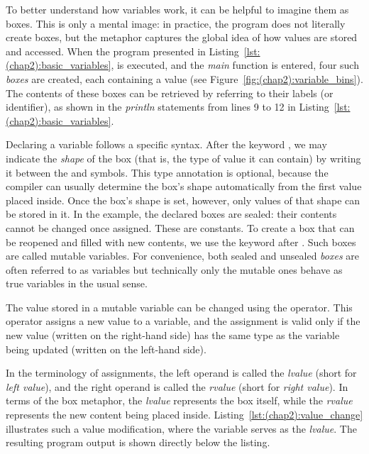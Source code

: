 To better understand how variables work, it can be helpful to imagine them as
boxes. This is only a mental image: in practice, the program does not literally
create boxes, but the metaphor captures the global idea of how values are stored
and accessed. When the program presented in
Listing~\ref{lst:(chap2):basic_variables}, is executed, and the \textit{main}
function is entered, four such \textit{boxes} are created, each containing a
value (see Figure~\ref{fig:(chap2):variable_bins}). The contents of these boxes
can be retrieved by referring to their labels (or identifier), as shown in the
\textit{println} statements from lines 9 to 12 in
Listing~\ref{lst:(chap2):basic_variables}.


Declaring a variable follows a specific syntax. After the keyword ,
we may indicate the \textit{shape} of the box (that is, the type of value it can
contain) by writing it between the \token{:} and \token{=} symbols. This type
annotation is optional, because the compiler can usually determine the box’s
shape automatically from the first value placed inside. Once the box’s shape is
set, however, only values of that shape can be stored in it. In the example, the
declared boxes are sealed: their contents cannot be changed once assigned. These
are constants. To create a box that can be reopened and filled with new
contents, we use the keyword  after . Such boxes are
called mutable variables. For convenience, both sealed and unsealed
\textit{boxes} are often referred to as variables but technically only the
mutable ones behave as true variables in the usual sense.



The value stored in a mutable variable can be changed using the \token{=}
operator. This operator assigns a new value to a variable, and the assignment is
valid only if the new value (written on the right-hand side) has the same type
as the variable being updated (written on the left-hand side).


In the terminology of assignments, the left operand is called the
\textit{lvalue} (short for \textit{left value}), and the right operand is called
the \textit{rvalue} (short for \textit{right value}). In terms of the box
metaphor, the \textit{lvalue} represents the box itself, while the
\textit{rvalue} represents the new content being placed inside.
Listing~\ref{lst:(chap2):value_change} illustrates such a value modification,
where the variable  serves as the \textit{lvalue}. The resulting
program output is shown directly below the listing.

